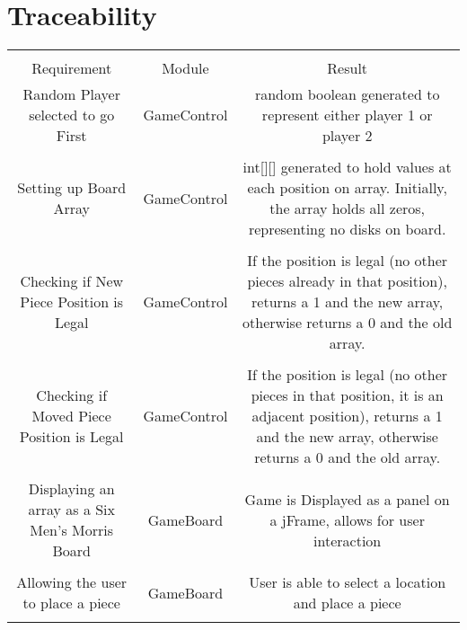 \documentclass[12pt]{article}
\begin{document}
	\section{Traceability}
	\begin{tabularx}{\linewidth}{|C|C|C|}
		\hline \\
		Requirement & Module & Result \\
		\hline
		Random Player selected to go First & GameControl & random boolean generated to represent either player 1 or player 2 \\
		\hline \\
		Setting up Board Array & GameControl & int[][] generated to hold values at each position on array. Initially, the array holds all zeros, representing no disks on board. \\
		\hline \\
		Checking if New Piece Position is Legal & GameControl & If the position is legal (no other pieces already in that position), returns a 1 and the new array, otherwise returns a 0 and the old array. \\ 
		\hline \\
		Checking if Moved Piece Position is Legal & GameControl & If the position is legal (no other pieces in that position, it is an adjacent position), returns a 1 and the new array, otherwise returns a 0 and the old array.\\
		\hline \\
		Displaying an array as a Six Men's Morris Board &
		GameBoard & Game is Displayed as a panel on a jFrame, allows for user interaction \\ 
		\hline \\
		Allowing the user to place a piece & GameBoard &
		User is able to select a location and place a piece \\
		\hline \\
	\end{tabularx}
\end{document}
